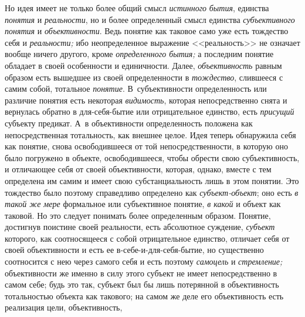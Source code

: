 Но идея имеет не только более общий смысл {\em истинного} {\em бытия}, единства
{\em понятия} и {\em реальности}, но и более определенный смысл единства
{\em субъективного понятия} и {\em объективности}. Ведь понятие как таковое
само уже есть тождество себя и {\em реальности;} ибо неопределенное выражение
<<реальность>> не означает вообще ничего другого, кроме {\em определенного
бытия;} а последним понятие обладает в своей особенности и единичности. Далее,
{\em объективность} равным образом есть вышедшее из своей определенности
в {\em тождество}, слившееся с самим собой, тотальное {\em понятие}.
В~субъективности определенность или различие понятия есть некоторая
{\em видимость}, которая непосредственно снята и вернулась обратно
в для-себя-бытие или отрицательное единство, есть {\em присущий} субъекту
предикат. А~в объективности определенность положена как непосредственная
тотальность, как внешнее целое. Идея теперь обнаружила себя как понятие,
снова освободившееся от той непосредственности, в которую оно было
погружено в объекте, освободившееся, чтобы обрести свою субъективность, и
отличающее себя от своей объективности, которая, однако, вместе с тем
определена им самим и имеет свою субстанциальность лишь в этом понятии. Это
тождество было поэтому справедливо определено как
{\em субъект-объект}; оно есть {\em в такой же
мере} формальное или субъективное понятие,
{\em в какой} и объект
как таковой. Но это следует понимать более определенным образом. Понятие,
достигнув поистине своей реальности, есть абсолютное суждение,
{\em субъект} которого,
как соотносящееся с собой отрицательное единство, отличает
себя от своей объективности и есть ее в-себе-и-для-себя-бытие, но
существенно соотносится с нею через самого себя и есть поэтому
{\em самоцель} и {\em стремление;}
объективности же именно в силу этого субъект не имеет
непосредственно в самом себе; будь это так, субъект был бы лишь потерянной
в объективность тотальностью объекта как такового; на самом же деле его
объективность есть реализация цели, объективность,
